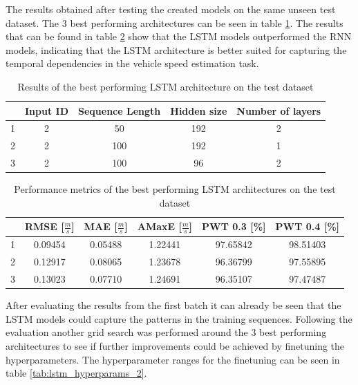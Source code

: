 The results obtained after testing the created models on the same unseen test dataset. The 3 best performing architectures can be seen in table \ref{tab:lstm_best_models_1}. The results that can be found in table \ref{tab:lstm_best_models_1_metrics} show that the LSTM models outperformed the RNN models, indicating that the LSTM architecture is better suited for capturing the temporal dependencies in the vehicle speed estimation task.
\FloatBarrier
\begin{table}[h]
    \centering
    \begin{tabular}{|c|c|c|c|c|}
        \hline
          & \textbf{Input ID} & \textbf{Sequence Length} & \textbf{Hidden size} & \textbf{Number of layers} \\
        \hline \hline
        1 & 2 & 50 & 192 & 2 \\
        \hline
        2 & 2 & 100 & 192 & 1 \\
        \hline
        3 & 2 & 100 & 96 & 2 \\
        \hline
    \end{tabular}
    \caption{Results of the best performing LSTM architecture on the test dataset}
    \label{tab:lstm_best_models_1}
\end{table}
\FloatBarrier
\FloatBarrier
\begin{table}[h]
    \centering
    \begin{tabular}{|c|c|c|c|c|c|}
        \hline
          & \textbf{RMSE [$\frac{m}{s}$]} & \textbf{MAE [$\frac{m}{s}$]} & \textbf{AMaxE [$\frac{m}{s}$]} & \textbf{PWT 0.3 [\%]} & \textbf{PWT 0.4 [\%]} \\
        \hline \hline
        1 & 0.09454 & 0.05488 & 1.22441 & 97.65842 & 98.51403 \\
        \hline
        2 & 0.12917 & 0.08065 & 1.23678 & 96.36799 & 97.55895 \\
        \hline
        3 & 0.13023 & 0.07710 & 1.24691 & 96.35107 & 97.47487 \\
        \hline
    \end{tabular}
    \caption{Performance metrics of the best performing LSTM architectures on the test dataset}
    \label{tab:lstm_best_models_1_metrics}
\end{table}
\FloatBarrier

After evaluating the results from the first batch it can already be seen that the LSTM models could capture the patterns in the training sequences. Following the evaluation another grid search was performed around the 3 best performing architectures to see if further improvements could be achieved by finetuning the hyperparameters. The hyperparameter ranges for the finetuning can be seen in table \ref{tab:lstm_hyperparams_2}.

